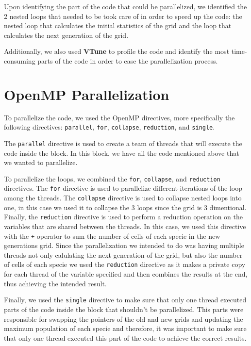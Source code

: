 \documentclass{article}
\begin{document}
Upon identifying the part of the code that could be parallelized, 
we identified the 2 nested loops that needed to be took care of in 
order to speed up the code: the nested loop that calculates the initial statistics 
of the grid and the loop that calculates the next generation of the grid. 

Additionally, we also used \textbf{VTune} to profile the code and 
identify the most time-consuming parts of the code in order to ease 
the parallelization process.

\section{OpenMP Parallelization}
To parallelize the code, we used the OpenMP directives, more specifically  
the following directives: \texttt{parallel}, \texttt{for}, \texttt{collapse}, 
\texttt{reduction}, and \texttt{single}.

The \texttt{parallel} directive is used to create a team of threads 
that will execute the code inside the block. In this block, we have 
all the code mentioned above that we wanted to parallelize.

To parallelize the loops, we combined the \texttt{for}, \texttt{collapse}, 
and \texttt{reduction} directives. The \texttt{for} directive is used to parallelize
different iterations of the loop among the threads. The \texttt{collapse} directive is used to collapse 
nested loops into one, in this case we used it to collapse the 3 loops since the grid is 3 dimentional.
Finally, the \texttt{reduction} directive is used to perform a reduction 
operation on the variables that are shared between the threads. In this case, we 
used this directive with the \texttt{+} operator to sum the number of cells of each 
specie in the new generations grid. Since the parallelization we intended to do was having 
multiple threads not only calulating the next generation of the grid, but also the 
number of cells of each specie we used the \texttt{reduction} directive as it 
makes a private copy for each thread of the variable specified and then combines 
the results at the end, thus achieving the intended result. 

Finally, we used the \texttt{single} directive to make sure that only one thread 
executed parts of the code inside the block that shouldn't be parallelized. This 
parts were responsible for swapping the pointers of the old and new grids and updating 
the maximum population of each specie and therefore, it was important to make sure that only 
one thread executed this part of the code to achieve the correct results.
\end{document}
